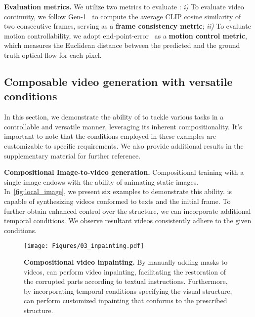 \textbf{Evaluation metrics.} 
We utilize two metrics to evaluate \method:
\textit{i)} To evaluate video continuity, we follow Gen-1~\cite{esser2023gen-1} to compute the average CLIP cosine similarity of two consecutive frames, serving as a \textbf{frame consistency metric};
\textit{ii)} To evaluate motion controllability, we adopt end-point-error~\cite{xu2022gmflow,teed2020raft} as a \textbf{motion control metric}, 
which measures the Euclidean distance between the predicted and the ground truth optical flow for each pixel.

\vspace{-2mm}

\subsection{Composable video generation with versatile conditions}

\vspace{-1mm}
In this section, we demonstrate the ability of \method to tackle various tasks in a controllable and versatile manner, leveraging its inherent compositionality. 
It's important to note that the conditions employed in these examples are customizable to specific requirements.
We also provide additional results in the supplementary material for further reference.

\textbf{Compositional Image-to-video generation.}
Compositional training with a single image endows \method with the ability of animating static images.
In~\cref{fig:local_image}, we present six examples to demonstrate this ability.
\method is capable of synthesizing videos conformed to texts and the initial frame.
To further obtain enhanced control over the structure, we can incorporate additional temporal conditions.
We observe resultant videos consistently adhere to the given conditions.

\begin{figure}[t]
    \centering
    \texttt{[image: Figures/03\_inpainting.pdf]}
     \vspace{-1.5em}
    \caption{
    \small
    \textbf{Compositional video inpainting.}
    By manually adding masks to videos, \method can perform video inpainting, facilitating the restoration of the corrupted parts according to textual instructions.
    Furthermore, by incorporating temporal conditions specifying the visual structure, \method can perform customized inpainting that conforms to the prescribed structure.
    }
    \label{fig:mask}
    \vspace{-5mm}
\end{figure}

